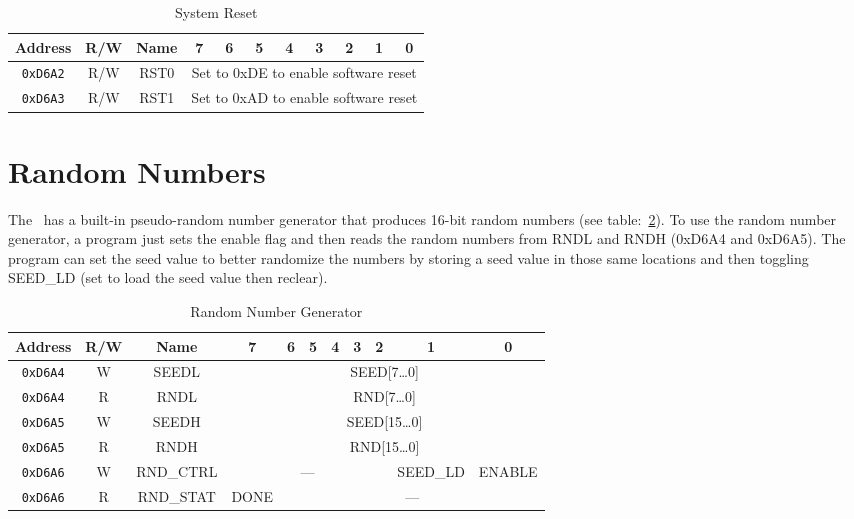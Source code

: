 \begin{table}[ht]
    \begin{center}
        \begin{tabular}{|c|c|c|c|c|c|c|c|c|c|c|} \hline
            Address & R/W & Name & 7 & 6 & 5 & 4 & 3 & 2 & 1 & 0 \\\hline\hline
            \verb+0xD6A2+ & R/W & RST0 & \multicolumn{8}{|c|}{Set to 0xDE to enable software reset} \\ \hline
            \verb+0xD6A3+ & R/W & RST1 & \multicolumn{8}{|c|}{Set to 0xAD to enable software reset} \\ \hline
        \end{tabular}
    \end{center}
    \caption{System Reset}
    \label{tab:sys_reset}
\end{table}

\section*{Random Numbers}

The \jr\ has a built-in pseudo-random number generator that produces 16-bit random numbers (see table:~\ref{tab:rng_reg}). To use the random number generator, a program just sets the enable flag and then reads the random numbers from RNDL and RNDH (0xD6A4 and 0xD6A5). The program can set the seed value to better randomize the numbers by storing a seed value in those same locations and then toggling SEED\_LD (set to load the seed value then reclear).

\begin{table}[ht]
    \begin{center}
        \begin{tabular}{|c|c|c|c|c|c|c|c|c|c|c|} \hline
            Address & R/W & Name & 7 & 6 & 5 & 4 & 3 & 2 & 1 & 0 \\\hline\hline
            \verb+0xD6A4+ & W & SEEDL & \multicolumn{8}{|c|}{SEED[7\ldots 0]} \\ \hline
            \verb+0xD6A4+ & R & RNDL & \multicolumn{8}{|c|}{RND[7\ldots 0]} \\ \hline
            \verb+0xD6A5+ & W & SEEDH & \multicolumn{8}{|c|}{SEED[15\ldots 0]} \\ \hline
            \verb+0xD6A5+ & R & RNDH &  \multicolumn{8}{|c|}{RND[15\ldots 0]} \\ \hline

            \verb+0xD6A6+ & W & RND\_CTRL & \multicolumn{6}{|c|}{---} & SEED\_LD & ENABLE \\ \hline
            \verb+0xD6A6+ & R & RND\_STAT & DONE & \multicolumn{7}{|c|}{---} \\ \hline

        \end{tabular}
    \end{center}
    \caption{Random Number Generator}
    \label{tab:rng_reg}
\end{table}

